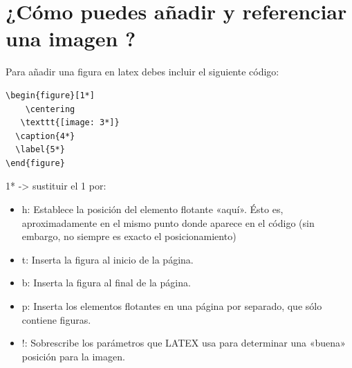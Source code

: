 \chapter{¿Cómo puedes añadir y referenciar una imagen ?}
Para añadir una figura en latex debes incluir el siguiente código:
\begin{verbatim}
\begin{figure}[1*]
	\centering
   \texttt{[image: 3*]}
  \caption{4*}
  \label{5*}
\end{figure}
\end{verbatim}
1* -> sustituir el 1 por:

\begin{itemize}
    \item h:	Establece la posición del elemento flotante «aquí». Ésto es, aproximadamente en el mismo punto donde aparece en el código (sin embargo, no siempre es exacto el posicionamiento)
    \item t:	Inserta la figura al inicio de la página.
    \item b:	Inserta la figura al final de la página.
    \item p:	Inserta los elementos flotantes en una página por separado, que sólo contiene figuras.
    \item !:	Sobrescribe los parámetros que LATEX usa para determinar una «buena» posición para la imagen.
\end{itemize}

